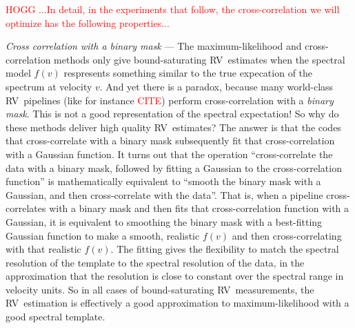 \documentclass[modern]{aastex631}
\renewcommand{\paragraph}[1]{\bigskip\par\noindent\textsl{#1} ---}
\newcommand{\todo}[1]{\textcolor{red}{#1}}  %
\newcommand{\CITE}{\todo{CITE}}
\newcommand{\acronym}[1]{{\small{#1}}}
\newcommand{\RV}{\acronym{RV}}
\begin{document}
\todo{HOGG ...In detail, in the experiments that follow, the
cross-correlation we will optimize has the following properties...}

\paragraph{Cross correlation with a binary mask}
The maximum-likelihood and cross-correlation methods only give
bound-saturating \RV\ estimates when the spectral model $f(v)$
respresents something similar to the true expecation of the spectrum
at velocity $v$.
And yet there is a paradox, because many world-class \RV\ pipelines
(like for instance \CITE) perform cross-correlation with a
\emph{binary mask}.
This is not a good representation of the spectral expectation! So why
do these methods deliver high quality \RV\ estimates?
The answer is that the codes that cross-correlate with a binary mask
subsequently fit that cross-correlation with a Gaussian function.
It turns out that the operation ``cross-correlate the data with a
binary mask, followed by fitting a Gaussian to the cross-correlation
function'' is mathematically equivalent to ``smooth the binary mask
with a Gaussian, and then cross-correlate with the data''.
That is, when a pipeline cross-correlates with a binary mask and then
fits that cross-correlation function with a Gaussian, it is equivalent
to smoothing the binary mask with a best-fitting Gaussian function to
make a smooth, realistic $f(v)$ and then cross-correlating with that
realistic $f(v)$.
The fitting gives the flexibility to match the spectral resolution of
the template to the spectral resolution of the data, in the
approximation that the resolution is close to constant over the
spectral range in velocity units.
So in all cases of bound-saturating \RV\ measurements, the
\RV\ estimation is effectively a good approximation to
maximum-likelihood with a good spectral template.
\end{document}
